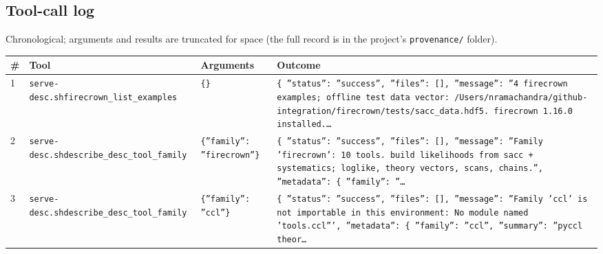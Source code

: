 \documentclass[11pt,a4paper]{article}
\begin{document}
\subsection{Tool-call log}
Chronological; arguments and results are truncated for space (the full record is in the project's \texttt{provenance/} folder).
\begin{longtable}{@{}p{}p{}p{}p{}@{}}
\toprule \# & Tool & Arguments & Outcome \\ \midrule \endhead
1 & \texttt{serve-desc.sh}\newline\texttt{firecrown\_\allowbreak{}list\_\allowbreak{}examples} & \texttt{\{\}\allowbreak{}} & \texttt{\{   ''status'':\allowbreak{} ''success'',\allowbreak{}   ''files'':\allowbreak{} []\allowbreak{},\allowbreak{}   ''message'':\allowbreak{} ''4 firecrown examples;\allowbreak{} offline test data vector:\allowbreak{} /\allowbreak{}Users/\allowbreak{}nramachandra/\allowbreak{}github-integration/\allowbreak{}firecrown/\allowbreak{}tests/\allowbreak{}sacc\_\allowbreak{}data.hdf5. firecrown 1.16.0 installed.\ldots{}\allowbreak{}} \\
2 & \texttt{serve-desc.sh}\newline\texttt{describe\_\allowbreak{}desc\_\allowbreak{}tool\_\allowbreak{}family} & \texttt{\{''family'':\allowbreak{} ''firecrown''\}\allowbreak{}} & \texttt{\{   ''status'':\allowbreak{} ''success'',\allowbreak{}   ''files'':\allowbreak{} []\allowbreak{},\allowbreak{}   ''message'':\allowbreak{} ''Family 'firecrown':\allowbreak{} 10 tools. build likelihoods from sacc + systematics;\allowbreak{} loglike,\allowbreak{} theory vectors,\allowbreak{} scans,\allowbreak{} chains.'',\allowbreak{}   ''metadata'':\allowbreak{} \{     ''family'':\allowbreak{} ''\ldots{}\allowbreak{}} \\
3 & \texttt{serve-desc.sh}\newline\texttt{describe\_\allowbreak{}desc\_\allowbreak{}tool\_\allowbreak{}family} & \texttt{\{''family'':\allowbreak{} ''ccl''\}\allowbreak{}} & \texttt{\{   ''status'':\allowbreak{} ''success'',\allowbreak{}   ''files'':\allowbreak{} []\allowbreak{},\allowbreak{}   ''message'':\allowbreak{} ''Family 'ccl' is not importable in this environment:\allowbreak{} No module named 'tools.ccl''',\allowbreak{}   ''metadata'':\allowbreak{} \{     ''family'':\allowbreak{} ''ccl'',\allowbreak{}     ''summary'':\allowbreak{} ''pyccl theor\ldots{}\allowbreak{}} \\

\end{longtable}
\end{document}
